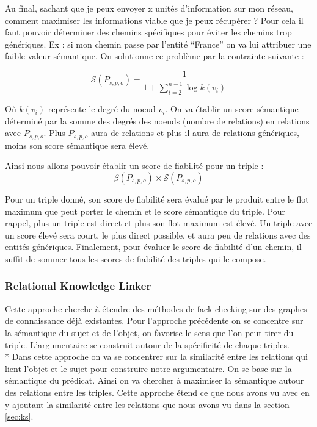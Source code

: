Au final, sachant que je peux envoyer x unités d'information sur mon réseau, comment maximiser les informations viable que je peux récupérer ? Pour cela il faut pouvoir déterminer des chemins spécifiques pour éviter les chemins trop génériques. Ex : si mon chemin passe par l'entité \enquote{France} on va lui attribuer une faible valeur sémantique. On solutionne ce problème par la contrainte suivante :

\begin{equation}
   \mathcal{S}(P_{s,p,o}) = \frac{1}{1 + \sum\limits_{i=2}^{n-1} \log k(v_{i})}
\end{equation}

Où $ k(v_{i}) $ représente le degré du noeud $ v_{i} $. On va établir un score sémantique déterminé par la somme des degrés des noeuds (nombre de relations) en relations avec $ P_{s,p,o} $. Plus $ P_{s,p,o} $ aura de relations et plus il aura de relations génériques, moins son score sémantique sera élevé.

Ainsi nous allons pouvoir établir un score de fiabilité pour un triple :
\begin{equation}
   \beta(P_{s,p,o}) \times \mathcal{S}(P_{s,p,o})
\end{equation}

Pour un triple donné, son score de fiabilité sera évalué par le produit entre le flot maximum que peut porter le chemin et le score sémantique du triple. Pour rappel, plus un triple est direct et plus son flot maximum est élevé. Un triple avec un score élevé sera court, le plus direct possible, et aura peu de relations avec des entités génériques. Finalement, pour évaluer le score de fiabilité d'un chemin, il suffit de sommer tous les scores de fiabilité des triples qui le compose.

\subsubsection{Relational Knowledge Linker}

Cette approche cherche à étendre des méthodes de fack checking sur des graphes de connaissance déjà existantes.
Pour l'approche précédente on se concentre sur la sémantique du sujet et de l'objet, on favorise le sens que l'on peut tirer du triple. L'argumentaire se construit autour de la spécificité de chaque triples. 
\\*
Dans cette approche on va se concentrer sur la similarité entre les relations qui lient l'objet et le sujet pour construire notre argumentaire. On se base sur la sémantique du prédicat. Ainsi on va chercher à maximiser la sémantique autour des relations entre les triples. Cette approche étend ce que nous avons vu avec \cite{ciampaglia2015computational} en y ajoutant la similarité entre les relations que nous avons vu dans la section \ref{sec:ks}.

